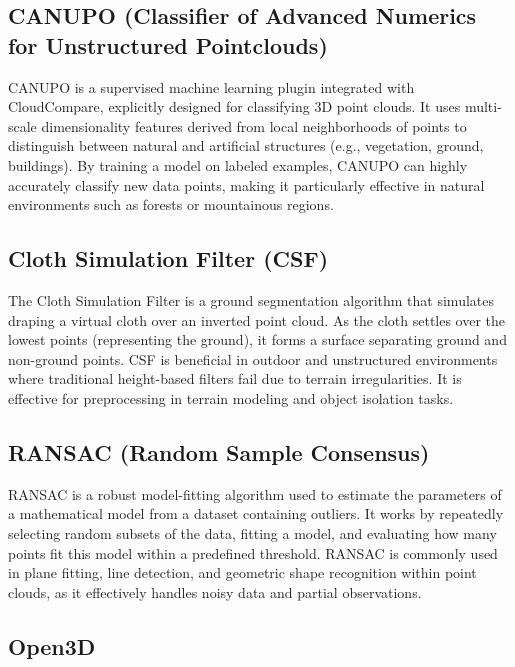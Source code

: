 \documentclass[../report.tex]{subfiles}
\begin{document}
    \subsection{CANUPO (Classifier of Advanced Numerics for Unstructured Pointclouds)}
    
    CANUPO is a supervised machine learning plugin integrated with CloudCompare, explicitly designed for classifying 3D point clouds. It uses multi-scale dimensionality features derived from local neighborhoods of points to distinguish between natural and artificial structures (e.g., vegetation, ground, buildings). By training a model on labeled examples, CANUPO can highly accurately classify new data points, making it particularly effective in natural environments such as forests or mountainous regions.
    
    \subsection{Cloth Simulation Filter (CSF)}
    
    The Cloth Simulation Filter\cite{ClothSF} is a ground segmentation algorithm that simulates draping a virtual cloth over an inverted point cloud. As the cloth settles over the lowest points (representing the ground), it forms a surface separating ground and non-ground points. CSF is beneficial in outdoor and unstructured environments where traditional height-based filters fail due to terrain irregularities. It is effective for preprocessing in terrain modeling and object isolation tasks.
    
    \subsection{RANSAC (Random Sample Consensus)}
    
    RANSAC is a robust model-fitting algorithm used to estimate the parameters of a mathematical model from a dataset containing outliers\cite{RANSAC}. It works by repeatedly selecting random subsets of the data, fitting a model, and evaluating how many points fit this model within a predefined threshold. RANSAC is commonly used in plane fitting, line detection, and geometric shape recognition within point clouds, as it effectively handles noisy data and partial observations.
    
    \subsection{Open3D}
    
\end{document}
